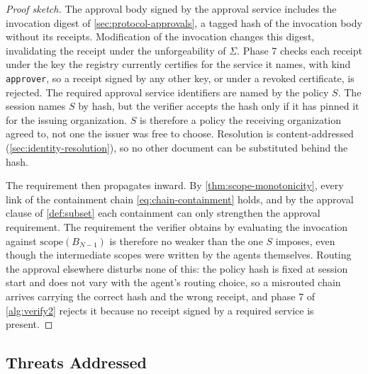 \documentclass[11pt,a4paper]{article}
\begin{document}
\begin{proof}[Proof sketch]
The approval body signed by the approval service includes
the invocation digest of \cref{sec:protocol-approvals}, a tagged hash of
the invocation body without its receipts. Modification of the invocation changes
this digest, invalidating the receipt under the unforgeability of
$\Sigma$. Phase 7
checks each receipt under the key the registry currently certifies for
the service it names, with kind \texttt{approver}, so a receipt signed
by any other key, or under a revoked certificate, is rejected. The
required approval service identifiers are named by the policy $S$. The
session names $S$ by hash, but the verifier accepts the hash only if it
has pinned it for the issuing organization. $S$ is therefore a policy
the receiving organization agreed to, not one the issuer was free to
choose. Resolution is content-addressed (\cref{sec:identity-resolution}),
so no other document can be substituted behind the hash.

The requirement then propagates inward. By
\cref{thm:scope-monotonicity}, every link of the containment chain
\cref{eq:chain-containment} holds, and by the approval clause of
\cref{def:subset} each containment can only strengthen the approval
requirement. The requirement the verifier
obtains by evaluating the invocation against $\mathrm{scope}(B_{N-1})$
is therefore no weaker than the one $S$ imposes, even though the
intermediate scopes were written by the agents themselves. Routing the
approval elsewhere disturbs none of this: the policy hash is fixed at
session start and does not vary with the agent's routing choice, so a
misrouted chain arrives carrying the correct hash and the wrong receipt,
and phase 7 of \cref{alg:verify2} rejects it because no receipt signed
by a required service is present.
\end{proof}

\subsection{Threats Addressed}
\label{sec:security-threats}
\end{document}

